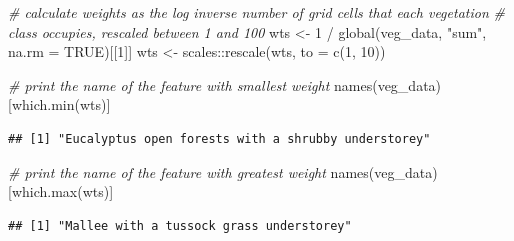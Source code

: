 \documentclass[
  12pt,
]{book}
\newenvironment{Shaded}{\begin{snugshade}}{\end{snugshade}}
\newcommand{\AttributeTok}[1]{\textcolor[rgb]{0.77,0.63,0.00}{#1}}
\newcommand{\CommentTok}[1]{\textcolor[rgb]{0.56,0.35,0.01}{\textit{#1}}}
\newcommand{\ConstantTok}[1]{\textcolor[rgb]{0.00,0.00,0.00}{#1}}
\newcommand{\DecValTok}[1]{\textcolor[rgb]{0.00,0.00,0.81}{#1}}
\newcommand{\FunctionTok}[1]{\textcolor[rgb]{0.00,0.00,0.00}{#1}}
\newcommand{\NormalTok}[1]{#1}
\newcommand{\OtherTok}[1]{\textcolor[rgb]{0.56,0.35,0.01}{#1}}
\newcommand{\SpecialCharTok}[1]{\textcolor[rgb]{0.00,0.00,0.00}{#1}}
\newcommand{\StringTok}[1]{\textcolor[rgb]{0.31,0.60,0.02}{#1}}
\begin{document}
\begin{Shaded}
\begin{Highlighting}[]
\CommentTok{\# calculate weights as the log inverse number of grid cells that each vegetation}
\CommentTok{\# class occupies, rescaled between 1 and 100}
\NormalTok{wts }\OtherTok{\textless{}{-}} \DecValTok{1} \SpecialCharTok{/} \FunctionTok{global}\NormalTok{(veg\_data, }\StringTok{"sum"}\NormalTok{, }\AttributeTok{na.rm =} \ConstantTok{TRUE}\NormalTok{)[[}\DecValTok{1}\NormalTok{]]}
\NormalTok{wts }\OtherTok{\textless{}{-}}\NormalTok{ scales}\SpecialCharTok{::}\FunctionTok{rescale}\NormalTok{(wts, }\AttributeTok{to =} \FunctionTok{c}\NormalTok{(}\DecValTok{1}\NormalTok{, }\DecValTok{10}\NormalTok{))}

\CommentTok{\# print the name of the feature with smallest weight}
\FunctionTok{names}\NormalTok{(veg\_data)[}\FunctionTok{which.min}\NormalTok{(wts)]}
\end{Highlighting}
\end{Shaded}

\begin{verbatim}
## [1] "Eucalyptus open forests with a shrubby understorey"
\end{verbatim}

\begin{Shaded}
\begin{Highlighting}[]
\CommentTok{\# print the name of the feature with greatest weight}
\FunctionTok{names}\NormalTok{(veg\_data)[}\FunctionTok{which.max}\NormalTok{(wts)]}
\end{Highlighting}
\end{Shaded}

\begin{verbatim}
## [1] "Mallee with a tussock grass understorey"
\end{verbatim}
\end{document}
